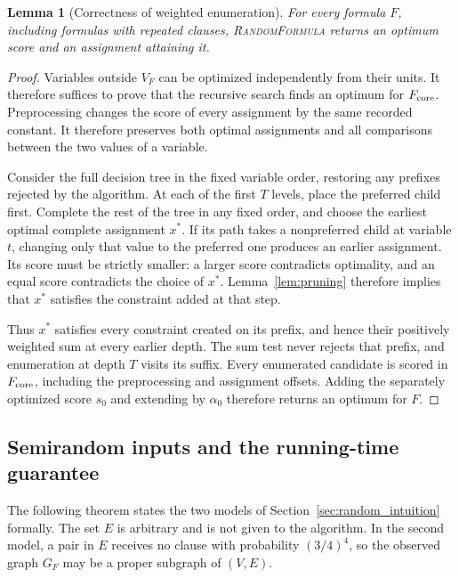 \documentclass[11pt,a4paper]{article}
\newtheorem{lemma}[theorem]{Lemma}
\theoremstyle{definition}
\theoremstyle{remark}
\begin{document}
\begin{lemma}[Correctness of weighted enumeration]\label{lem:exactA}
For every formula $F$, including formulas with repeated
clauses, \textnormal{\textsc{RandomFormula}} returns an optimum score and
an assignment attaining it.
\end{lemma}
\begin{proof}
Variables outside $V_F$ can be optimized independently from their units.
It therefore suffices to prove that the recursive search finds an optimum
for $F_{\rm core}$. Preprocessing changes the score of every assignment
by the same recorded constant. It therefore preserves both optimal assignments and all
comparisons between the two values of a variable.

Consider the full decision tree in the fixed variable order, restoring
any prefixes rejected by the algorithm. At each of the first $T$ levels,
place the preferred child first. Complete the rest of the tree in any
fixed order, and choose the earliest optimal complete assignment $x^*$.
If its path takes a nonpreferred child at variable $t$, changing only
that value to the preferred one produces an earlier assignment. Its
score must be strictly smaller: a larger score contradicts optimality,
and an equal score contradicts the choice of $x^*$.
Lemma~\ref{lem:pruning} therefore implies that $x^*$ satisfies the
constraint added at that step.

Thus $x^*$ satisfies every constraint created on its prefix, and hence
their positively weighted sum at every earlier depth. The sum test never
rejects that prefix, and enumeration at depth $T$ visits its suffix.
Every enumerated candidate is scored in $F_{\rm core}$, including
the preprocessing and assignment offsets. Adding the separately optimized
score $s_0$ and extending by $\alpha_0$ therefore returns an optimum for $F$.
\end{proof}


\subsection{Semirandom inputs and the running-time guarantee}\label{sec:random_inputs}

The following theorem states the two models of
Section~\ref{sec:random_intuition} formally. The set $E$ is arbitrary and
is not given to the algorithm. In the second model, a pair in $E$ receives
no clause with probability $(3/4)^4$, so the observed graph $G_F$ may be a
proper subgraph of $(V,E)$.
\end{document}
